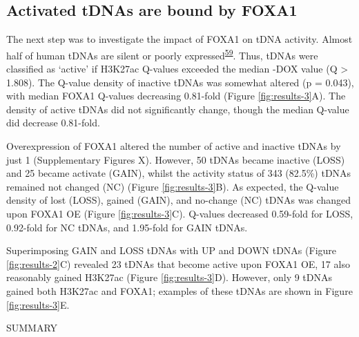 \documentclass[
  12pt,
]{article}
\begin{document}
\hypertarget{activated-tdnas-are-bound-by-foxa1}{%
\subsection{Activated tDNAs are bound by FOXA1}\label{activated-tdnas-are-bound-by-foxa1}}

The next step was to investigate the impact of FOXA1 on tDNA activity.
Almost half of human tDNAs are silent or poorly expressed\textsuperscript{\protect\hyperlink{ref-Torres2019}{59}}.
Thus, tDNAs were classified as `active' if H3K27ac Q-values exceeded the median -DOX value (Q \textgreater{} 1.808).
The Q-value density of inactive tDNAs was somewhat altered (p = 0.043), with median FOXA1 Q-values decreasing 0.81-fold (Figure \ref{fig:results-3}A).
The density of active tDNAs did not significantly change, though the median Q-value did decrease 0.81-fold.

Overexpression of FOXA1 altered the number of active and inactive tDNAs by just 1 (Supplementary Figures X).
However, 50 tDNAs became inactive (LOSS) and 25 became activate (GAIN), whilst the activity status of 343 (82.5\%) tDNAs remained not changed (NC) (Figure \ref{fig:results-3}B).
As expected, the Q-value density of lost (LOSS), gained (GAIN), and no-change (NC) tDNAs was changed upon FOXA1 OE (Figure \ref{fig:results-3}C).
Q-values decreased 0.59-fold for LOSS, 0.92-fold for NC tDNAs, and 1.95-fold for GAIN tDNAs.

Superimposing GAIN and LOSS tDNAs with UP and DOWN tDNAs (Figure \ref{fig:results-2}C) revealed 23 tDNAs that become active upon FOXA1 OE, 17 also reasonably gained H3K27ac (Figure \ref{fig:results-3}D).
However, only 9 tDNAs gained both H3K27ac and FOXA1; examples of these tDNAs are shown in Figure \ref{fig:results-3}E.

SUMMARY
\end{document}
